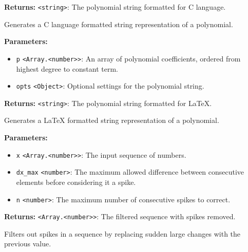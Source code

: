 \documentclass[12pt,a4paper]{article}
\begin{document}
\noindent \textbf{Returns:} \texttt{<string>}: The polynomial string formatted for C language.

\noindent Generates a C language formatted string representation of a polynomial.

\vspace{5mm}
\noindent {}


\noindent \textbf{Parameters:}
\begin{itemize}
  \item \texttt{p} \texttt{<Array.<number>>}: An array of polynomial coefficients, ordered from highest degree to constant term.
  \item \texttt{opts} \texttt{<Object>}: Optional settings for the polynomial string.
\end{itemize}

\noindent \textbf{Returns:} \texttt{<string>}: The polynomial string formatted for LaTeX.

\noindent Generates a LaTeX formatted string representation of a polynomial.

\vspace{5mm}
\noindent {}


\noindent \textbf{Parameters:}
\begin{itemize}
  \item \texttt{x} \texttt{<Array.<number>>}: The input sequence of numbers.
  \item \texttt{dx\_max} \texttt{<number>}: The maximum allowed difference between consecutive elements before considering it a spike.
  \item \texttt{n} \texttt{<number>}: The maximum number of consecutive spikes to correct.
\end{itemize}

\noindent \textbf{Returns:} \texttt{<Array.<number>>}: The filtered sequence with spikes removed.

\noindent Filters out spikes in a sequence by replacing sudden large changes with the previous value.

\vspace{5mm}
\noindent {}
\end{document}
